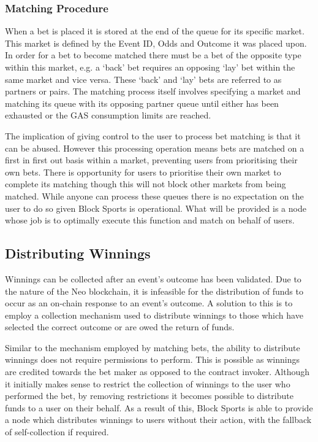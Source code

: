\documentclass{article}
\begin{document}
\subsubsection{Matching Procedure}
When a bet is placed it is stored at the end of the queue for its specific market. This market is defined by the Event ID, Odds and Outcome it was placed upon. In order for a bet to become matched there must be a bet of the opposite type within this market, e.g. a ‘back’ bet requires an opposing ‘lay’ bet within the same market and vice versa. These ‘back’ and ‘lay’ bets are referred to as partners or pairs. The matching process itself involves specifying a market and matching its queue with its opposing partner queue until either has been exhausted or the GAS consumption limits are reached.

The implication of giving control to the user to process bet matching is that it can be abused. However this processing operation means bets are matched on a first in first out basis within a market, preventing users from prioritising their own bets. There is opportunity for users to prioritise their own market to complete its matching though this will not block other markets from being matched. While anyone can process these queues there is no expectation on the user to do so given Block Sports is operational. What will be provided is a node whose job is to optimally execute this function and match on behalf of users.


	\subsection{Distributing Winnings}
Winnings can be collected after an event’s outcome has been validated. Due to the nature of the Neo blockchain, it is infeasible for the distribution of funds to occur as an on-chain response to an event’s outcome. A solution to this is to employ a collection mechanism used to distribute winnings to those which have selected the correct outcome or are owed the return of funds.

Similar to the mechanism employed by matching bets, the ability to distribute winnings does not require permissions to perform. This is possible as winnings are credited towards the bet maker as opposed to the contract invoker. Although it initially makes sense to restrict the collection of winnings to the user who performed the bet, by removing restrictions it becomes possible to distribute funds to a user on their behalf. As a result of this, Block Sports is able to provide a node which distributes winnings to users without their action, with the fallback of self-collection if required.
\end{document}
